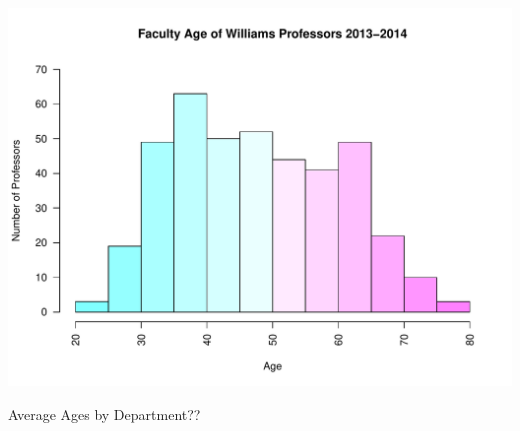 \documentclass[12pt,a4paper]{article}\usepackage[]{graphicx}\usepackage[]{color}
\makeatletter
\def\maxwidth{ %
  \ifdim\Gin@nat@width>\linewidth
    \linewidth
  \else
    \Gin@nat@width
  \fi
}
\newenvironment{knitrout}{}{} %
\theoremstyle{definition}
\makeatother
\begin{document}
\begin{knitrout}
\includegraphics[width=\maxwidth]{figure/unnamed-chunk-9-10} 

\end{knitrout}

\bigskip
Average Ages by Department??
\end{document}
